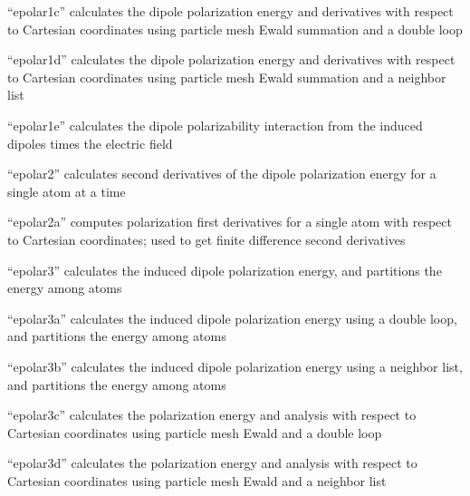 \documentclass[letterpaper,11pt,english]{sphinxmanual}
\begin{document}

“epolar1c” calculates the dipole polarization energy and
derivatives with respect to Cartesian coordinates using
particle mesh Ewald summation and a double loop


“epolar1d” calculates the dipole polarization energy and
derivatives with respect to Cartesian coordinates using
particle mesh Ewald summation and a neighbor list


“epolar1e” calculates the dipole polarizability interaction
from the induced dipoles times the electric field


“epolar2” calculates second derivatives of the dipole polarization
energy for a single atom at a time


“epolar2a” computes polarization first derivatives for a single
atom with respect to Cartesian coordinates; used to get finite
difference second derivatives


“epolar3” calculates the induced dipole polarization energy,
and partitions the energy among atoms


“epolar3a” calculates the induced dipole polarization energy
using a double loop, and partitions the energy among atoms


“epolar3b” calculates the induced dipole polarization energy
using a neighbor list, and partitions the energy among atoms


“epolar3c” calculates the polarization energy and analysis with
respect to Cartesian coordinates using particle mesh Ewald and
a double loop


“epolar3d” calculates the polarization energy and analysis with
respect to Cartesian coordinates using particle mesh Ewald and
a neighbor list

\end{document}
